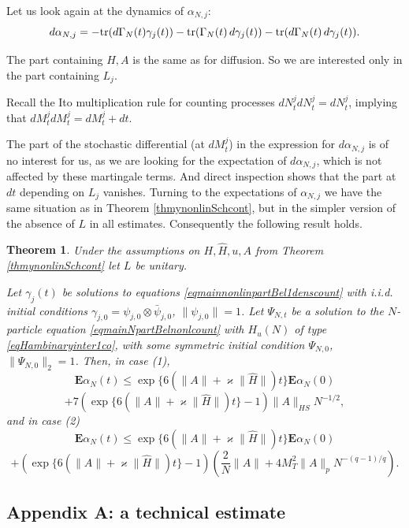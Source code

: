 \documentclass[12pt]{article}
\def\E{\mathbf{E}}
\def\tr{\rm{tr}}
\def\al{\alpha}
\def\ga{\gamma}
\def\ka{\varkappa}
\newtheorem{theorem}{Theorem}[section]
\newcommand{\Ga}{\Gamma}
\begin{document}
Let us look again at the dynamics of $\al_{N,j}$:
\[
d \al_{N,j}=-{\tr} (d\Ga_N(t) \ga_j(t))-{\tr} (\Ga_N(t) \, d\ga_j(t))-{\tr} (d\Ga_N(t) \, d\ga_j(t)).
\]

The part containing $H,A$ is the same as for diffusion. So we are interested only in the part containing $L_j$.

Recall the Ito multiplication rule for counting processes $dN_t^j dN_t^j=dN_t^j$, implying that
$dM_t^j dM_t^j=dM_t^j+dt$.

The part of the stochastic differential (at $dM^j_t$) in the expression for $d \al_{N,j}$ is of no interest
for us, as we are looking for the expectation of $d \al_{N,j}$, which is not affected by these martingale terms.
And direct inspection shows that the part at $dt$ depending on $L_j$ vanishes.
Turning to the expectations of  $\al_{N,j}$ we have the same situation as in Theorem
\ref{thmynonlinSchcont}, but in the simpler version of the absence of $L$ in all estimates.
Consequently the following result holds.

\begin{theorem}
\label{thmynonlinSchcount}
Under the assumptions on $H,\hat H, u, A$ from Theorem
\ref{thmynonlinSchcont} let  $L$ be unitary.

 Let $\ga_j(t)$ be solutions to equations
\eqref{eqmainnonlinpartBel1denscount} with i.i.d. initial conditions
$\ga_{j,0}=\psi_{j,0}\otimes \bar \psi_{j,0}$, $\|\psi_{j,0}\|=1$.
Let $\Psi_{N,t}$ be a solution to the $N$-particle equation \eqref{eqmainNpartBelnonlcount}
with $H_u(N)$ of type \eqref{eqHambinaryinter1co}, with some symmetric initial condition
$\Psi_{N,0}$, $\|\Psi_{N,0}\|_2=1$.
Then, in case (1),
\[
\E \al_N(t) \le \exp\{6(\|A\|+\ka \|\hat H\|)t\} \E \al_{N}(0)
\]
\[
+7 \left(\exp\{6(\|A\|+\ka \|\hat H\|)t\}-1\right)\|A\|_{HS} N^{-1/2},
\]
and in case (2)
\[
\E \al_N(t) \le \exp\{6(\|A\|+\ka \|\hat H\|)t\} \E \al_{N}(0)
\]
\[
+\left(\exp\{6(\|A\|+\ka \|\hat H\|)t\}-1\right)
\left(\frac{2}{N}\|A\|+ 4 M_T^2 \|A\|_p N^{-(q-1)/q}\right).
\]
\end{theorem}


\subsection{Appendix A: a technical estimate}
\end{document}
